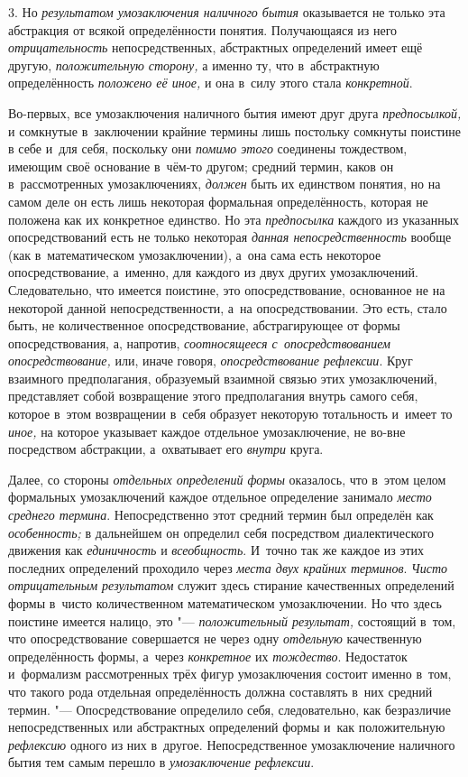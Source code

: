 3. Но {\em результатом
умозаключения наличного бытия} оказывается не только эта
абстракция от всякой определённости понятия. Получающаяся из него
{\em отрицательность}
непосредственных, абстрактных определений имеет ещё другую,
{\em положительную сторону,}
а именно ту, что в~абстрактную определённость
{\em положено её иное,}
и она в~силу этого стала
{\em конкретной}.

Во-первых, все умозаключения наличного бытия имеют друг друга
{\em предпосылкой,} и
сомкнутые в~заключении крайние термины лишь постольку сомкнуты поистине в
себе и~для себя, поскольку они {\em помимо этого}
соединены тождеством, имеющим своё основание в~чём-то другом;
средний термин, каков он в~рассмотренных умозаключениях, {\em должен} быть
их единством понятия, но на самом деле он есть лишь некоторая формальная
определённость, которая не положена как их конкретное единство. Но эта
{\em предпосылка} каждого из указанных опосредствований есть не только
некоторая {\em данная непосредственность}
вообще (как в~математическом умозаключении), а~она сама есть
некоторое опосредствование, а~именно, для каждого из двух других
умозаключений. Следовательно, что имеется поистине, это опосредствование,
основанное не на некоторой данной непосредственности, а~на
опосредствовании. Это есть, стало быть, не количественное опосредствование,
абстрагирующее от формы опосредствования, а, напротив,
{\em соотносящееся с~опосредствованием
опосредствование,} или, иначе говоря, {\em опосредствование рефлексии}.
Круг взаимного предполагания, образуемый взаимной связью этих
умозаключений, представляет собой возвращение этого предполагания внутрь
самого себя, которое в~этом возвращении в~себя образует некоторую
тотальность и~имеет то {\em иное,}
на которое указывает каждое отдельное умозаключение, не
во-вне посредством абстракции, а~охватывает его {\em внутри} круга.

Далее, со стороны {\em отдельных определений формы}
оказалось, что в~этом целом формальных умозаключений каждое
отдельное определение занимало {\em место среднего термина}.
Непосредственно этот средний термин был определён как {\em особенность;} в
дальнейшем он определил себя посредством диалектического движения как
{\em единичность} и {\em всеобщность}.
И~точно так же каждое из этих последних определений проходило через
{\em места двух крайних терминов}. {\em Чисто отрицательным результатом}
служит здесь стирание качественных определений формы в~чисто
количественном математическом умозаключении. Но что здесь поистине имеется
налицо, это "--- {\em положительный
результат,} состоящий в~том, что опосредствование
совершается не через одну {\em отдельную}
качественную определённость формы, а~через
{\em конкретное} их {\em тождество}.
Недостаток и~формализм рассмотренных трёх фигур умозаключения
состоит именно в~том, что такого рода отдельная определённость должна
составлять в~них средний термин. "--- Опосредствование
определило себя, следовательно, как безразличие непосредственных или
абстрактных определений формы и~как положительную
{\em рефлексию} одного из них в~другое. Непосредственное
умозаключение наличного бытия тем самым перешло в
{\em умозаключение рефлексии}.\label{bkm:bm110b}

